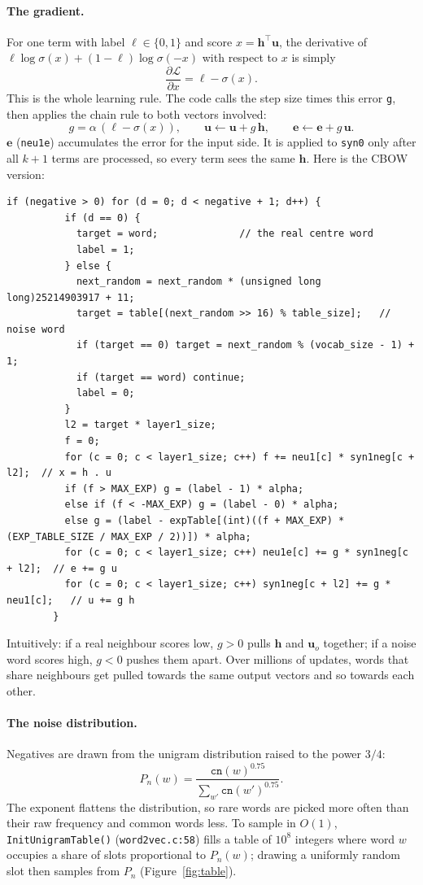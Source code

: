 \documentclass[11pt,a4paper]{article}
\newcommand{\code}[1]{\texttt{#1}}
\newcommand{\src}[1]{\texttt{word2vec.c:#1}}
\newcommand{\vout}{\mathbf{u}}
\begin{document}
\paragraph{The gradient.}
For one term with label $\ell\in\{0,1\}$ and score $x = \mathbf{h}^{\top}\vout$,
the derivative of $\ell\log\sigma(x) + (1-\ell)\log\sigma(-x)$ with respect to $x$ is
simply
\[
  \frac{\partial \mathcal{L}}{\partial x} = \ell - \sigma(x).
\]
This is the whole learning rule. The code calls the step size times this error
\code{g}, then applies the chain rule to both vectors involved:
\[
  g = \alpha\,(\ell - \sigma(x)), \qquad
  \vout \leftarrow \vout + g\,\mathbf{h}, \qquad
  \mathbf{e} \leftarrow \mathbf{e} + g\,\vout .
\]
$\mathbf{e}$ (\code{neu1e}) accumulates the error for the input side. It is applied
to \code{syn0} only after all $k+1$ terms are processed, so every term sees the same
$\mathbf{h}$. Here is the CBOW version:

\begin{lstlisting}[firstnumber=480]
        if (negative > 0) for (d = 0; d < negative + 1; d++) {
          if (d == 0) {
            target = word;              // the real centre word
            label = 1;
          } else {
            next_random = next_random * (unsigned long long)25214903917 + 11;
            target = table[(next_random >> 16) % table_size];   // noise word
            if (target == 0) target = next_random % (vocab_size - 1) + 1;
            if (target == word) continue;
            label = 0;
          }
          l2 = target * layer1_size;
          f = 0;
          for (c = 0; c < layer1_size; c++) f += neu1[c] * syn1neg[c + l2];  // x = h . u
          if (f > MAX_EXP) g = (label - 1) * alpha;
          else if (f < -MAX_EXP) g = (label - 0) * alpha;
          else g = (label - expTable[(int)((f + MAX_EXP) * (EXP_TABLE_SIZE / MAX_EXP / 2))]) * alpha;
          for (c = 0; c < layer1_size; c++) neu1e[c] += g * syn1neg[c + l2];  // e += g u
          for (c = 0; c < layer1_size; c++) syn1neg[c + l2] += g * neu1[c];   // u += g h
        }
\end{lstlisting}

Intuitively: if a real neighbour scores low, $g>0$ pulls $\mathbf{h}$ and
$\vout_o$ together; if a noise word scores high, $g<0$ pushes them apart. Over
millions of updates, words that share neighbours get pulled towards the same
output vectors and so towards each other.

\paragraph{The noise distribution.}
Negatives are drawn from the unigram distribution raised to the power $3/4$:
\[
  P_n(w) = \frac{\code{cn}(w)^{0.75}}{\sum_{w'}\code{cn}(w')^{0.75}} .
\]
The exponent flattens the distribution, so rare words are picked more often than
their raw frequency and common words less. To sample in $O(1)$,
\code{InitUnigramTable()} (\src{58}) fills a table of $10^8$ integers where word
$w$ occupies a share of slots proportional to $P_n(w)$; drawing a uniformly random
slot then samples from $P_n$ (Figure~\ref{fig:table}).
\end{document}
